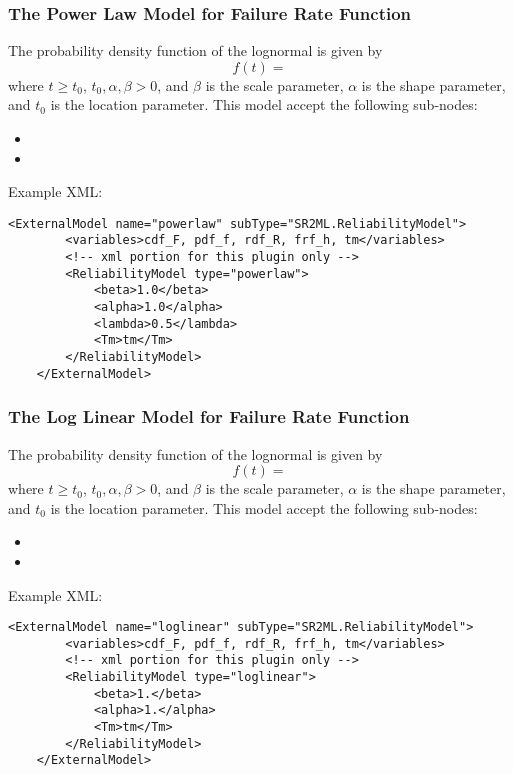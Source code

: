 \subsubsection{The Power Law Model for Failure Rate Function}
The probability density function of the lognormal is given by
\begin{equation}
	f(t) =
\end{equation}
where $t\geq t_0$, $t_0, \alpha, \beta >0$, and $\beta$ is the scale parameter, $\alpha$ is the shape
parameter, and $t_0$ is the location parameter.
This model accept the following sub-nodes:
\begin{itemize}
	\item {}
	\item {}
\end{itemize}

Example XML:
\begin{lstlisting}[style=XML]
	<ExternalModel name="powerlaw" subType="SR2ML.ReliabilityModel">
		<variables>cdf_F, pdf_f, rdf_R, frf_h, tm</variables>
		<!-- xml portion for this plugin only -->
		<ReliabilityModel type="powerlaw">
			<beta>1.0</beta>
			<alpha>1.0</alpha>
			<lambda>0.5</lambda>
			<Tm>tm</Tm>
		</ReliabilityModel>
	</ExternalModel>
\end{lstlisting}


\subsubsection{The Log Linear Model for Failure Rate Function}
The probability density function of the lognormal is given by
\begin{equation}
	f(t) =
\end{equation}
where $t\geq t_0$, $t_0, \alpha, \beta >0$, and $\beta$ is the scale parameter, $\alpha$ is the shape
parameter, and $t_0$ is the location parameter.
This model accept the following sub-nodes:
\begin{itemize}
	\item {}
	\item {}
\end{itemize}

Example XML:
\begin{lstlisting}[style=XML]
	<ExternalModel name="loglinear" subType="SR2ML.ReliabilityModel">
		<variables>cdf_F, pdf_f, rdf_R, frf_h, tm</variables>
		<!-- xml portion for this plugin only -->
		<ReliabilityModel type="loglinear">
			<beta>1.</beta>
			<alpha>1.</alpha>
			<Tm>tm</Tm>
		</ReliabilityModel>
	</ExternalModel>
\end{lstlisting}


